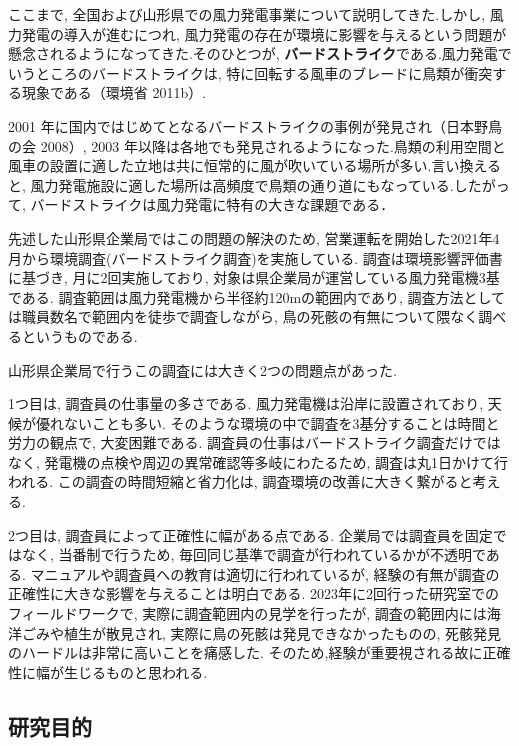 \documentclass[dvipdfmx]{jsarticle}
\begin{document}
ここまで, 全国および山形県での風力発電事業について説明してきた.しかし, 風力発電の導入が進むにつれ, 風力発電の存在が環境に影響を与えるという問題が懸念されるようになってきた.そのひとつが, \textbf{バードストライク}である.風力発電でいうところのバードストライクは, 特に回転する風車のブレードに鳥類が衝突する現象である（環境省 2011b）.

2001 年に国内ではじめてとなるバードストライクの事例が発見され（日本野鳥の会 2008）, 2003 年以降は各地でも発見されるようになった.鳥類の利用空間と風車の設置に適した立地は共に恒常的に風が吹いている場所が多い.言い換えると, 風力発電施設に適した場所は高頻度で鳥類の通り道にもなっている.したがって, バードストライクは風力発電に特有の大きな課題である．

先述した山形県企業局ではこの問題の解決のため, 営業運転を開始した2021年4月から環境調査(バードストライク調査)を実施している.
調査は環境影響評価書に基づき, 月に2回実施しており, 対象は県企業局が運営している風力発電機3基である.
調査範囲は風力発電機から半径約120mの範囲内であり, 調査方法としては職員数名で範囲内を徒歩で調査しながら, 鳥の死骸の有無について隈なく調べるというものである.

山形県企業局で行うこの調査には大きく2つの問題点があった.

1つ目は, 調査員の仕事量の多さである.
風力発電機は沿岸に設置されており, 天候が優れないことも多い.
そのような環境の中で調査を3基分することは時間と労力の観点で, 大変困難である.
調査員の仕事はバードストライク調査だけではなく, 発電機の点検や周辺の異常確認等多岐にわたるため, 調査は丸1日かけて行われる.
この調査の時間短縮と省力化は, 調査環境の改善に大きく繋がると考える.

2つ目は, 調査員によって正確性に幅がある点である.
企業局では調査員を固定ではなく, 当番制で行うため, 毎回同じ基準で調査が行われているかが不透明である.
マニュアルや調査員への教育は適切に行われているが, 
経験の有無が調査の正確性に大きな影響を与えることは明白である.
2023年に2回行った研究室でのフィールドワークで, 実際に調査範囲内の見学を行ったが, 
調査の範囲内には海洋ごみや植生が散見され, 実際に鳥の死骸は発見できなかったものの, 
死骸発見のハードルは非常に高いことを痛感した.
そのため,経験が重要視される故に正確性に幅が生じるものと思われる.


\subsection{研究目的}
\end{document}
